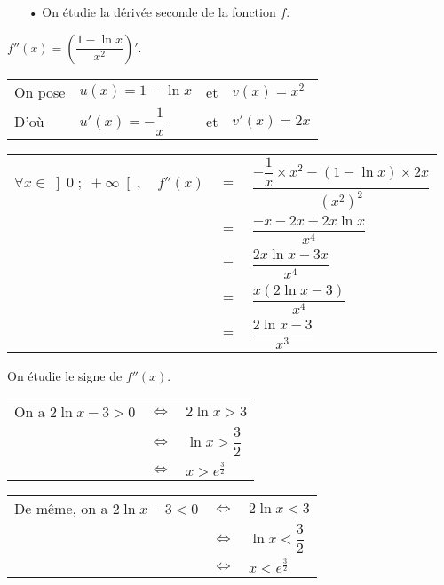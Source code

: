 \begin{itemize}
\item[•] On étudie la dérivée seconde de la fonction $f$.
\end{itemize}

\vspace*{.3cm}

$f''(x) = \left(\dfrac{1 - \ln x}{x^2}\right)'$. \\

\begin{tabular}{llll}
On pose & $u(x) = 1 - \ln x$ & et & $v(x) = x^2$ \\
D'où & $u'(x) = -\dfrac{1}{x}$ & et & $v'(x) = 2x$ \\
\end{tabular}

\vspace*{.3cm}

\begin{tabular}{llll}
$\forall x \in \left]0 \; ; \; +\infty\right[,$ & $f''(x)$ & $=$ & $\dfrac{-\dfrac{1}{x}\times x^2 - \left(1-\ln x\right)\times 2x}{\left(x^2\right)^2}$ \vspace*{.3cm} \\
& & $=$ & $\dfrac{-x -2x + 2x\ln x}{x^4}$ \vspace*{.3cm} \\
& & $=$ & $\dfrac{2x\ln x - 3x}{x^4}$ \vspace*{.3cm} \\
& & $=$ & $\dfrac{x\left(2\ln x - 3\right)}{x^4}$ \vspace*{.3cm} \\
& & $=$ & $\dfrac{2\ln x - 3}{x^3}$ \\
\end{tabular}

\vspace*{.3cm}

On étudie le signe de $f''(x)$. \\

\begin{tabular}{lll}
On a $2\ln x -3 > 0$ & $\Longleftrightarrow$ & $2 \ln x > 3$ \\
& $\Longleftrightarrow$ & $\ln x > \dfrac{3}{2}$ \\
& $\Longleftrightarrow$ & $x > e^{\frac{3}{2}}$ \\
\end{tabular}

\vspace*{.3cm}

\begin{tabular}{lll}
De même, on a $2\ln x -3 < 0$ & $\Longleftrightarrow$ & $2 \ln x < 3$ \\
& $\Longleftrightarrow$ & $\ln x < \dfrac{3}{2}$ \\
& $\Longleftrightarrow$ & $x < e^{\frac{3}{2}}$ \\
\end{tabular}

